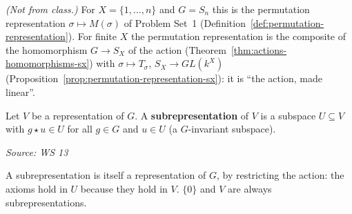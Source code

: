 \documentclass[11pt]{report}
\newcommand{\srcline}[1]{\par\hfill{\footnotesize\textit{Source: #1}}}
\begin{document}
\textit{(Not from class.)} For $X = \{1, \ldots, n\}$ and $G = S_n$ this is the permutation representation $\sigma \mapsto M(\sigma)$ of Problem Set~1 (Definition~\ref{def:permutation-representation}). For finite $X$ the permutation representation is the composite of the homomorphism $G \to S_X$ of the action (Theorem~\ref{thm:actions-homomorphisms-sx}) with $\sigma \mapsto T_\sigma$, $S_X \to GL(k^X)$ (Proposition~\ref{prop:permutation-representation-sx}): it is ``the action, made linear''.

\begin{defbox}[{Subrepresentation}]\label{def:subrepresentation}
Let $V$ be a representation of $G$. A \textbf{subrepresentation} of $V$ is a subspace $U \subseteq V$ with $g \star u \in U$ for all $g \in G$ and $u \in U$ (a $G$-invariant subspace).
\srcline{WS 13}
\end{defbox}

A subrepresentation is itself a representation of $G$, by restricting the action: the axioms hold in $U$ because they hold in $V$. $\{0\}$ and $V$ are always subrepresentations.
\end{document}
